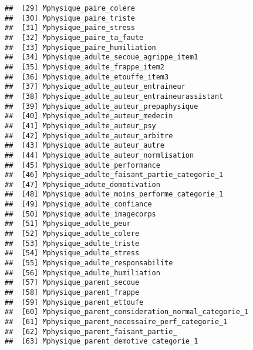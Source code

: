 \documentclass[
]{article}
\begin{document}
\begin{verbatim}
##  [29] Mphysique_paire_colere                                           
##  [30] Mphysique_paire_triste                                           
##  [31] Mphysique_paire_stress                                           
##  [32] Mphysique_paire_ta_faute                                         
##  [33] Mphysique_paire_humiliation                                      
##  [34] Mphysique_adulte_secoue_agrippe_item1                            
##  [35] Mphysique_adulte_frappe_item2                                    
##  [36] Mphysique_adulte_etouffe_item3                                   
##  [37] Mphysique_adulte_auteur_entraineur                               
##  [38] Mphysique_adulte_auteur_entraineurassistant                      
##  [39] Mphysique_adulte_auteur_prepaphysique                            
##  [40] Mphysique_adulte_auteur_medecin                                  
##  [41] Mphysique_adulte_auteur_psy                                      
##  [42] Mphysique_adulte_auteur_arbitre                                  
##  [43] Mphysique_adulte_auteur_autre                                    
##  [44] Mphysique_adulte_auteur_normlisation                             
##  [45] Mphysique_adulte_performance                                     
##  [46] Mphysique_adulte_faisant_partie_categorie_1                      
##  [47] Mphysique_adute_domotivation                                     
##  [48] Mphysique_adulte_moins_performe_categorie_1                      
##  [49] Mphysique_adulte_confiance                                       
##  [50] Mphysique_adulte_imagecorps                                      
##  [51] Mphysique_adulte_peur                                            
##  [52] Mphysique_adulte_colere                                          
##  [53] Mphysique_adulte_triste                                          
##  [54] Mphysique_adulte_stress                                          
##  [55] Mphysique_adulte_responsabilite                                  
##  [56] Mphysique_adulte_humiliation                                     
##  [57] Mphysique_parent_secoue                                          
##  [58] Mphysique_parent_frappe                                          
##  [59] Mphysique_parent_ettoufe                                         
##  [60] Mphysique_parent_consideration_normal_categorie_1                
##  [61] Mphysique_parent_necessaire_perf_categorie_1                     
##  [62] Mphysique_parent_faisant_partie_                                 
##  [63] Mphysique_parent_demotive_categorie_1                            

\end{verbatim}
\end{document}
